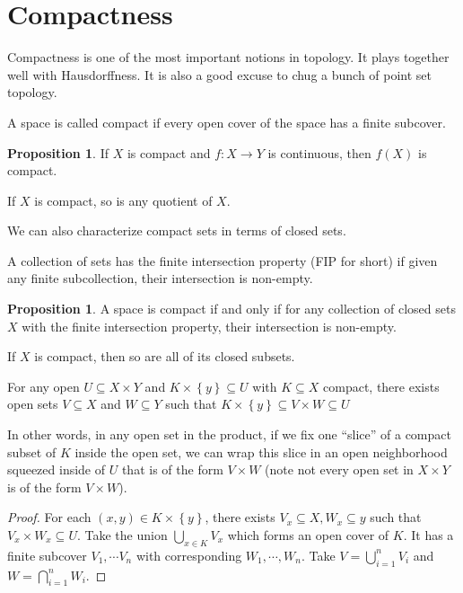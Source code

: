 \documentclass[12pt,reqno]{amsart}
\numberwithin{theorem}{section}
\theoremstyle{definition}
\theoremstyle{remark}
\numberwithin{equation}{section}
\newcommand{\set}[1]{\left \{ #1 \right \}}
\theoremstyle{definition}
\newtheorem{prop}[theorem]{Proposition}
\begin{document}
\section{Compactness}
Compactness is one of the most important notions in topology. It plays together well with Hausdorffness. It is also a good excuse to chug a bunch of point set topology.
\begin{definition}
    A space is called compact if every open cover of the space has a finite subcover.
\end{definition}
\begin{prop}
    If $X$ is compact and $f:X\rightarrow Y$ is continuous, then $f(X)$ is compact.
\end{prop}
\begin{corollary}
    If $X$ is compact, so is any quotient of $X$.
\end{corollary}
We can also characterize compact sets in terms of closed sets.
\begin{definition}
    A collection of sets has the finite intersection property (FIP for short) if given any finite subcollection, their intersection is non-empty.
\end{definition}
\begin{prop}
    A space is compact if and only if for any collection of closed sets $X$ with the finite intersection property, their intersection is non-empty.
\end{prop}
\begin{corollary}
If $X$ is compact, then so are all of its closed subsets.
\end{corollary}
\begin{lemma}
    For any open $U\subseteq X\times Y$ and $K\times \set{y} \subseteq U$ with $K\subseteq X$ compact, there exists open sets $V\subseteq X$ and $W\subseteq Y$ such that $K\times \set{y} \subseteq V\times W \subseteq U$
\end{lemma}
In other words, in any open set in the product, if we fix one ``slice'' of a compact subset of $K$ inside the open set, we can wrap this slice in an open neighborhood squeezed inside of $U$ that is of the form $V\times W$ (note not every open set in $X\times Y$ is of the form $V\times W$).
\begin{proof}
    For each $(x,y) \in K\times \set{y}$, there exists $V_x \subseteq X, W_x \subseteq y$ such that $V_x\times W_x \subseteq U$. Take the union $\bigcup_{x \in K} V_x$ which forms an open cover of $K$. It has a finite subcover $V_1,\cdots V_n$ with corresponding $W_1,\cdots,W_n$. Take $V = \bigcup_{i=1}^n V_i$ and $W = \bigcap_{i=1}^n W_i$.
\end{proof}
\end{document}
